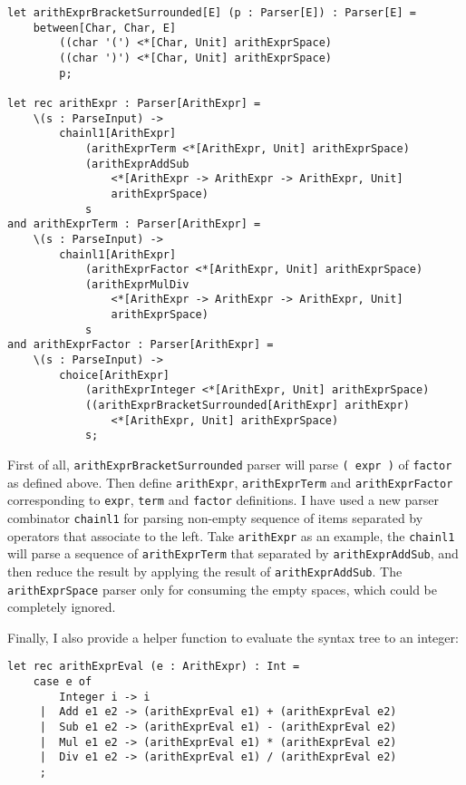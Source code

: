 \begin{lstlisting}
let arithExprBracketSurrounded[E] (p : Parser[E]) : Parser[E] =
    between[Char, Char, E]
        ((char '(') <*[Char, Unit] arithExprSpace)
        ((char ')') <*[Char, Unit] arithExprSpace)
        p;

let rec arithExpr : Parser[ArithExpr] =
    \(s : ParseInput) ->
        chainl1[ArithExpr]
            (arithExprTerm <*[ArithExpr, Unit] arithExprSpace)
            (arithExprAddSub
                <*[ArithExpr -> ArithExpr -> ArithExpr, Unit]
                arithExprSpace)
            s
and arithExprTerm : Parser[ArithExpr] =
    \(s : ParseInput) ->
        chainl1[ArithExpr]
            (arithExprFactor <*[ArithExpr, Unit] arithExprSpace)
            (arithExprMulDiv
                <*[ArithExpr -> ArithExpr -> ArithExpr, Unit]
                arithExprSpace)
            s
and arithExprFactor : Parser[ArithExpr] =
    \(s : ParseInput) ->
        choice[ArithExpr]
            (arithExprInteger <*[ArithExpr, Unit] arithExprSpace)
            ((arithExprBracketSurrounded[ArithExpr] arithExpr)
                <*[ArithExpr, Unit] arithExprSpace)
            s;
\end{lstlisting}

First of all, \texttt{arithExprBracketSurrounded} parser will parse \texttt{( expr )} of \texttt{factor} as defined above. Then define \texttt{arithExpr}, \texttt{arithExprTerm} and \texttt{arithExprFactor} corresponding to \texttt{expr}, \texttt{term} and \texttt{factor} definitions. I have used a new parser combinator \texttt{chainl1} for parsing non-empty sequence of items separated by operators that associate to the left. Take \texttt{arithExpr} as an example, the \texttt{chainl1} will parse a sequence of \texttt{arithExprTerm} that separated by \texttt{arithExprAddSub}, and then reduce the result by applying the result of \texttt{arithExprAddSub}. The \texttt{arithExprSpace} parser only for consuming the empty spaces, which could be completely ignored.

Finally, I also provide a helper function to evaluate the syntax tree to an integer:

\begin{lstlisting}
let rec arithExprEval (e : ArithExpr) : Int =
    case e of
        Integer i -> i
     |  Add e1 e2 -> (arithExprEval e1) + (arithExprEval e2)
     |  Sub e1 e2 -> (arithExprEval e1) - (arithExprEval e2)
     |  Mul e1 e2 -> (arithExprEval e1) * (arithExprEval e2)
     |  Div e1 e2 -> (arithExprEval e1) / (arithExprEval e2)
     ;
\end{lstlisting}

